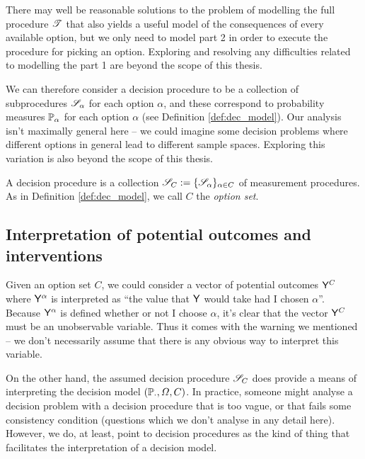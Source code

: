 There may well be reasonable solutions to the problem of modelling the full procedure $\mathscr{T}$ that also yields a useful model of the consequences of every available option, but we only need to model part 2 in order to execute the procedure for picking an option. Exploring and resolving any difficulties related to modelling the part 1 are beyond the scope of this thesis.

We can therefore consider a decision procedure to be a collection of subprocedures $\mathscr{S}_\alpha$ for each option $\alpha$, and these correspond to probability measures $\mathbb{P}_\alpha$ for each option $\alpha$ (see Definition \ref{def:dec_model}). Our analysis isn't maximally general here -- we could imagine some decision problems where different options in general lead to different sample spaces. Exploring this variation is also beyond the scope of this thesis.

\begin{definition}\label{def:dec_proc}
A decision procedure is a collection $\mathscr{S}_C:=\{\mathscr{S}_\alpha\}_{\alpha\in C}$ of measurement procedures. As in Definition \ref{def:dec_model}, we call $C$ the \emph{option set}.
\end{definition}

\subsection{Interpretation of potential outcomes and interventions}

Given an option set $C$, we could consider a vector of potential outcomes $\mathsf{Y}^C$  where $\mathsf{Y}^\alpha$ is interpreted as ``the value that $\mathsf{Y}$ would take had I chosen $\alpha$''. Because $\mathsf{Y}^\alpha$ is defined whether or not I choose $\alpha$, it's clear that the vector $\mathsf{Y}^C$ must be an unobservable variable. Thus it comes with the warning we mentioned -- we don't necessarily assume that there is any obvious way to interpret this variable.

On the other hand, the assumed decision procedure $\mathscr{S}_C$ does provide a means of interpreting the decision model $(\mathbb{P}_\cdot,\Omega,C)$. In practice, someone might analyse a decision problem with a decision procedure that is too vague, or that fails some consistency condition (questions which we don't analyse in any detail here). However, we do, at least, point to decision procedures as the kind of thing that facilitates the interpretation of a decision model.

